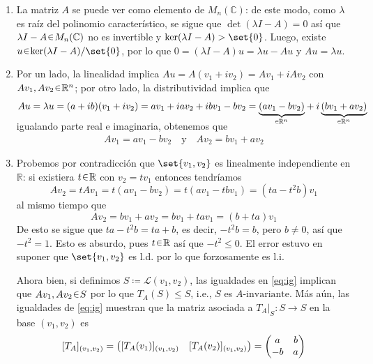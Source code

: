 \begin{sol}
\begin{enumerate}[leftmargin=*, label=(\alph*)]
\item La matriz $A$ se puede ver como elemento de $M_n(\mathbb{C})$: de este modo, como $\lambda$ es raíz del polinomio característico, se sigue que $\det(\lambda I - A) = 0$ así que $\lambda I - A \en M_n(\mathbb{C})$ no es invertible y $\ker(\lambda I - A) > \set{0}$. Luego, existe $u \en \ker(\lambda I - A)/\set{0}$, por lo que $0 = (\lambda I - A)u = \lambda u - Au$ y $Au = \lambda u$.

\item Por un lado, la linealidad implica $Au = A(v_1 + iv_2) = Av_1 + iAv_2$ con $Av_1, Av_2 \en \mathbb{R}^n$; por otro lado, la distributividad implica que 
\[
Au = \lambda u = (a + ib)(v_1 + iv_2) = av_1 + iav_2 + ibv_1 - bv_2 = \smash{{\underbrace{(av_1 - bv_2)}_{\en\mathbb{R}^n}} + {i\underbrace{(bv_1 + av_2)}_{\en\mathbb{R}^n}}} 
\]
igualando parte real e imaginaria, obtenemos que 
\begin{gather}\label{eq:ig}
Av_1 = av_1 - bv_2%
\quad\text{y}\quad%
Av_2 = bv_1 + av_2
\end{gather}

\item Probemos por contradicción que $\set{v_1,v_2}$ es linealmente independiente en $\mathbb{R}$: si existiera $t \en \mathbb{R}$ con $v_2 = tv_1$ entonces tendríamos
\[
Av_2 = tAv_1 = t(av_1 - bv_2) = t(av_1 -tb v_1) = (ta-t^2b)v_1
\]
al mismo tiempo que
\[
Av_2 = bv_1 + av_2 = bv_1 + tav_1 = (b + ta)v_1
\]
De esto se sigue que $ta - t^2b = ta + b$, es decir, $-t^2b = b$, pero $b \neq0$, así que $-t^2 = 1$. Esto es absurdo, pues $t \en \mathbb{R}$ así que $-t^2 \leq 0$. El error estuvo en suponer que $\set{v_1,v_2}$ es l.d. por lo que forzosamente es l.i.\par
Ahora bien, si definimos $S \coloneq \mathcal{L}(v_1,v_2)$, las igualdades en \eqref{eq:ig} implican que $Av_1,Av_2 \en S$ por lo que $T_A(S) \leq S$, i.e., $S$ es $A\text{-invariante}$. Más aún, las igualdades de \eqref{eq:ig} muestran que la matriz asociada a $T_A|_S \colon S \to S$ en la base $(v_1,v_2)$ es
\[
[T_A]_{(v_1,v_2)} = \mqty([T_A(v_1)]_{(v_1,v_2)}&[T_A(v_2)]_{(v_1,v_2)}) = \mqty(a&b\\-b&a)
\]


\end{enumerate}
\end{sol}
